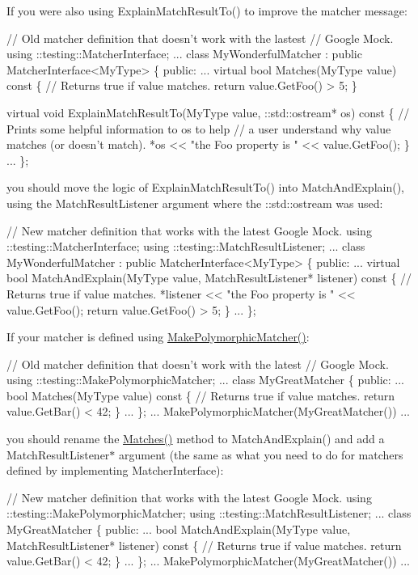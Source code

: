 If you were also using {\ttfamily Explain\+Match\+Result\+To()} to improve the matcher message\+: 
\begin{DoxyCode}
// Old matcher definition that doesn't work with the lastest
// Google Mock.
using ::testing::MatcherInterface;
...
class MyWonderfulMatcher : public MatcherInterface<MyType> \{
 public:
  ...
  virtual bool Matches(MyType value) const \{
    // Returns true if value matches.
    return value.GetFoo() > 5;
  \}

  virtual void ExplainMatchResultTo(MyType value,
                                    ::std::ostream* os) const \{
    // Prints some helpful information to os to help
    // a user understand why value matches (or doesn't match).
    *os << "the Foo property is " << value.GetFoo();
  \}
  ...
\};
\end{DoxyCode}


you should move the logic of {\ttfamily Explain\+Match\+Result\+To()} into {\ttfamily Match\+And\+Explain()}, using the {\ttfamily Match\+Result\+Listener} argument where the {\ttfamily \+::std\+::ostream} was used\+: 
\begin{DoxyCode}
// New matcher definition that works with the latest Google Mock.
using ::testing::MatcherInterface;
using ::testing::MatchResultListener;
...
class MyWonderfulMatcher : public MatcherInterface<MyType> \{
 public:
  ...
  virtual bool MatchAndExplain(MyType value,
                               MatchResultListener* listener) const \{
    // Returns true if value matches.
    *listener << "the Foo property is " << value.GetFoo();
    return value.GetFoo() > 5;
  \}
  ...
\};
\end{DoxyCode}


If your matcher is defined using {\ttfamily \hyperlink{namespacetesting_a667ca94f190ec2e17ee2fbfdb7d3da04}{Make\+Polymorphic\+Matcher()}}\+: 
\begin{DoxyCode}
// Old matcher definition that doesn't work with the latest
// Google Mock.
using ::testing::MakePolymorphicMatcher;
...
class MyGreatMatcher \{
 public:
  ...
  bool Matches(MyType value) const \{
    // Returns true if value matches.
    return value.GetBar() < 42;
  \}
  ...
\};
... MakePolymorphicMatcher(MyGreatMatcher()) ...
\end{DoxyCode}


you should rename the {\ttfamily \hyperlink{namespacetesting_ad53b509ae9cd51040d67f668f99702ae}{Matches()}} method to {\ttfamily Match\+And\+Explain()} and add a {\ttfamily Match\+Result\+Listener$\ast$} argument (the same as what you need to do for matchers defined by implementing {\ttfamily Matcher\+Interface})\+: 
\begin{DoxyCode}
// New matcher definition that works with the latest Google Mock.
using ::testing::MakePolymorphicMatcher;
using ::testing::MatchResultListener;
...
class MyGreatMatcher \{
 public:
  ...
  bool MatchAndExplain(MyType value,
                       MatchResultListener* listener) const \{
    // Returns true if value matches.
    return value.GetBar() < 42;
  \}
  ...
\};
... MakePolymorphicMatcher(MyGreatMatcher()) ...
\end{DoxyCode}


